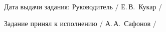 {  \vspace{2em}

  Дата выдачи задания: \uline{\hspace*{6em}} \hspace{2ex} Руководитель \hfill{} \uline{\hspace*{4em}} / Е.\,В.~Кукар /

  \vspace{1em}

  Задание принял к исполнению \hfill{} \uline{\hspace*{4em}} / А.\,А.~Сафонов /

  \restoregeometry
}
